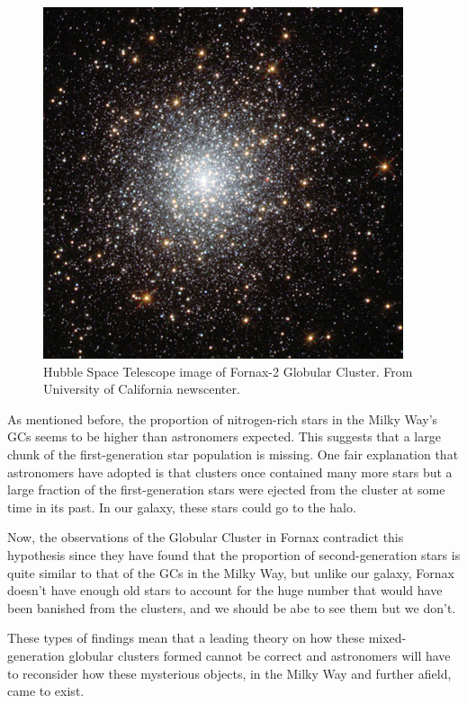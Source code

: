 \begin{figure}[H]
\begin{minipage}[b]{0.45\textwidth}
    \includegraphics[width=\textwidth]{images/fornax-3-400.jpg}
    \caption[Hubble Space Telescope image of Fornax-3 Globular Cluster]{Hubble Space Telescope image of Fornax-2 Globular Cluster. From University of California newscenter.}
  \end{minipage}
\end{figure}

As mentioned before, the proportion of nitrogen-rich stars in the Milky Way's GCs seems to be higher than astronomers expected. This suggests that a large chunk of the first-generation star population is missing. One fair explanation that astronomers have adopted is that clusters once contained many more stars but a large fraction of the first-generation stars were ejected from the cluster at some time in its past. In our galaxy, these stars could go to the halo.

Now, the observations of the Globular Cluster in Fornax contradict this hypothesis since they have found that the proportion of second-generation stars is quite similar to that of the GCs in the Milky Way, but unlike our galaxy, Fornax doesn't have enough old stars to account for the huge number that would have been banished from the clusters, and we should be abe to see them but we don't.

These types of findings mean that a leading theory on how these mixed-generation globular clusters formed cannot be correct and astronomers will have to reconsider how these mysterious objects, in the Milky Way and further afield, came to exist.

